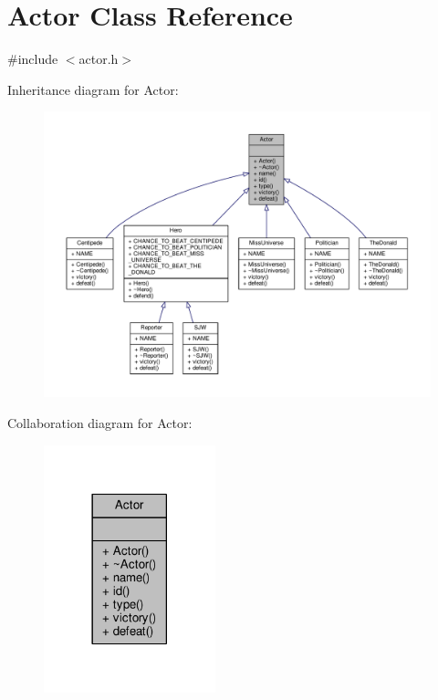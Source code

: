 \hypertarget{classActor}{}\section{Actor Class Reference}
\label{classActor}


{\ttfamily \#include $<$actor.\+h$>$}



Inheritance diagram for Actor\+:
\nopagebreak
\begin{figure}[H]
\begin{center}
\leavevmode
\includegraphics[width=350pt]{classActor__inherit__graph}
\end{center}
\end{figure}


Collaboration diagram for Actor\+:
\nopagebreak
\begin{figure}[H]
\begin{center}
\leavevmode
\includegraphics[width=141pt]{classActor__coll__graph}
\end{center}
\end{figure}

